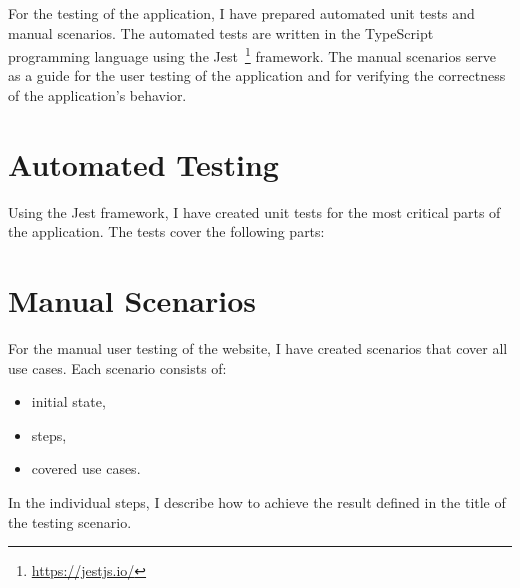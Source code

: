 For the testing of the application, I have prepared automated unit tests and manual scenarios.
The automated tests are written in the TypeScript programming language using the Jest~\footnote{\url{https://jestjs.io/}} framework.
The manual scenarios serve as a guide for the user testing of the application
and for verifying the correctness of the application's behavior.


\section{Automated Testing}
Using the Jest framework, I have created unit tests for the most critical parts of the application.
The tests cover the following parts:


\section{Manual Scenarios}
For the manual user testing of the website, I have created scenarios that cover all use cases.
Each scenario consists of:
\begin{itemize}
    \item initial state,
    \item steps,
    \item covered use cases.
\end{itemize}

In the individual steps, I describe how to achieve the result defined in the title of the testing scenario.

\newcommand{\testing}[2]{%
    \stepcounter{testingcounter}%
    \subsection{T\arabic{testingcounter} -- #1}
}




